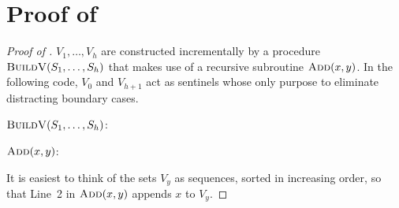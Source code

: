 \documentclass[kpfonts]{patmorin}
\newcommand{\snote}[1]{\fcolorbox{red}{yellow}{#1}}
\newcommand{\pnote}[1]{\ \newline\noindent\fcolorbox{red}{yellow}{\begin{minipage}{\textwidth}#1\end{minipage}}}
\let\ge\geqslant
\begin{document}
  



\newpage
\appendix

\section{Proof of }


\begin{proof}[Proof of ]
  $V_1,\ldots,V_{h}$ are constructed incrementally by a procedure $\textsc{BuildV}(S_1,\ldots,S_h)$ that makes use of a recursive subroutine $\textsc{Add}(x, y)$.  In the following code, $V_0$ and $V_{h+1}$ act as sentinels whose only purpose to eliminate distracting boundary cases.
  
  \noindent$\textsc{BuildV}(S_1,\ldots,S_h)$:
  \begin{algorithmic}[1]
        \ENDIF
      \ENDFOR
    \ENDFOR
  \end{algorithmic}
  
  \noindent$\textsc{Add}(x, y)$:
  \begin{algorithmic}[1]
      \IF{$|V_y|\ge 4$}      
        \ENDIF
      \ENDIF
    \ENDIF
  \end{algorithmic}

  It is easiest to think of the sets $V_y$ as sequences, sorted in increasing order, so that Line~2 in $\textsc{Add}(x,y)$ appends $x$ to $V_y$.
  

\end{proof}
\end{document}
